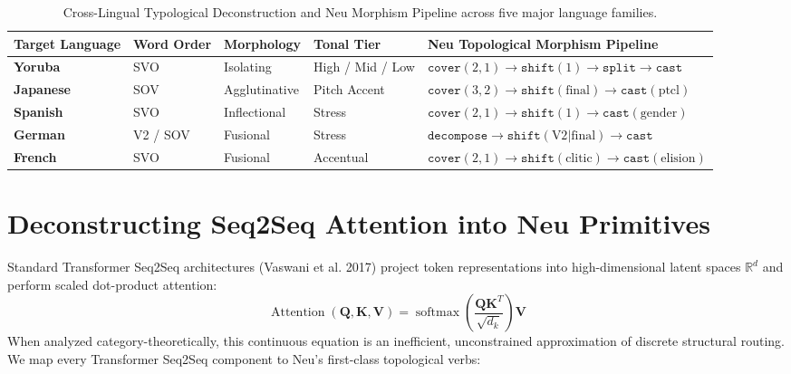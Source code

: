\documentclass[11pt]{article}
\begin{document}
\begin{table}[htbp]
\centering
\small
\setlength{\tabcolsep}{4.5pt}
\begin{tabularx}{\linewidth}{lll >{\raggedright\arraybackslash}p{2.2cm} >{\raggedright\arraybackslash}X}
\toprule
\textbf{Target Language} & \textbf{Word Order} & \textbf{Morphology} & \textbf{Tonal Tier} & \textbf{Neu Topological Morphism Pipeline} \\
\midrule
\textbf{Yoruba} & SVO & Isolating & High / Mid / Low & $\mathtt{cover}(2,1) \to \mathtt{shift}(1) \to \mathtt{split} \to \mathtt{cast}$ \\
\textbf{Japanese} & SOV & Agglutinative & Pitch Accent & $\mathtt{cover}(3,2) \to \mathtt{shift}(\text{final}) \to \mathtt{cast}(\text{ptcl})$ \\
\textbf{Spanish} & SVO & Inflectional & Stress & $\mathtt{cover}(2,1) \to \mathtt{shift}(1) \to \mathtt{cast}(\text{gender})$ \\
\textbf{German} & V2 / SOV & Fusional & Stress & $\mathtt{decompose} \to \mathtt{shift}(\text{V2}|\text{final}) \to \mathtt{cast}$ \\
\textbf{French} & SVO & Fusional & Accentual & $\mathtt{cover}(2,1) \to \mathtt{shift}(\text{clitic}) \to \mathtt{cast}(\text{elision})$ \\
\bottomrule
\end{tabularx}
\caption{Cross-Lingual Typological Deconstruction and Neu Morphism Pipeline across five major language families.}
\label{tab:typological_comparison}
\end{table}

\section{Deconstructing Seq2Seq Attention into Neu Primitives}

Standard Transformer Seq2Seq architectures (Vaswani et al. 2017) project token representations into high-dimensional latent spaces $\mathbb{R}^d$ and perform scaled dot-product attention:
\begin{equation}
\operatorname{Attention}(\mathbf{Q}, \mathbf{K}, \mathbf{V}) = \operatorname{softmax}\left(\frac{\mathbf{Q}\mathbf{K}^T}{\sqrt{d_k}}\right)\mathbf{V}
\end{equation}
When analyzed category-theoretically, this continuous equation is an inefficient, unconstrained approximation of discrete structural routing. We map every Transformer Seq2Seq component to Neu's first-class topological verbs:
\end{document}
